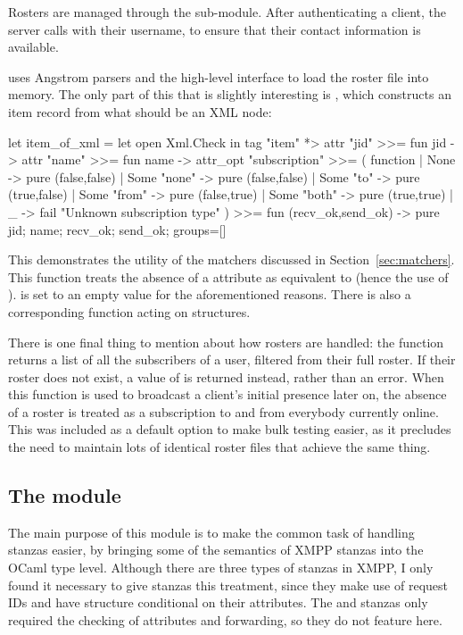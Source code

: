 Rosters are managed through the  sub-module. After authenticating a client, the server calls  with their username, to ensure that their contact information is available.

 uses Angstrom parsers and the high-level  interface to load the roster file into memory. The only part of this that is slightly interesting is , which constructs an item record from what should be an  XML node:

\begin{ocaml}
let item_of_xml =
  let open Xml.Check in
  tag "item" *> attr "jid" >>= fun jid ->
    attr "name" >>= fun name ->
      attr_opt "subscription" >>= ( function
      | None        -> pure (false,false)
      | Some "none" -> pure (false,false)
      | Some "to"   -> pure (true,false)
      | Some "from" -> pure (false,true)
      | Some "both" -> pure (true,true)
      | _ -> fail "Unknown subscription type" ) >>=
  fun (recv_ok,send_ok) ->
    pure { jid; name; recv_ok; send_ok; groups=[] }
\end{ocaml}

This demonstrates the utility of the  matchers discussed in Section~\ref{sec:matchers}. This function treats the absence of a  attribute as equivalent to  (hence the use of ).  is set to an empty value for the aforementioned reasons. There is also a corresponding  function acting on  structures.

There is one final thing to mention about how rosters are handled: the function  returns a list of all the subscribers of a user, filtered from their full roster. If their roster does not exist, a value of  is returned instead, rather than an error. When this function is used to broadcast a client's initial presence later on, the absence of a roster is treated as a subscription to and from everybody currently online. This was included as a default option to make bulk testing easier, as it precludes the need to maintain lots of identical roster files that achieve the same thing.

\subsection{The  module}
The main purpose of this module is to make the common task of handling stanzas easier, by bringing some of the semantics of XMPP stanzas into the OCaml type level. Although there are three types of stanzas in XMPP, I only found it necessary to give  stanzas this treatment, since they make use of request IDs and have structure conditional on their attributes. The  and  stanzas only required the checking of attributes and forwarding, so they do not feature here.


